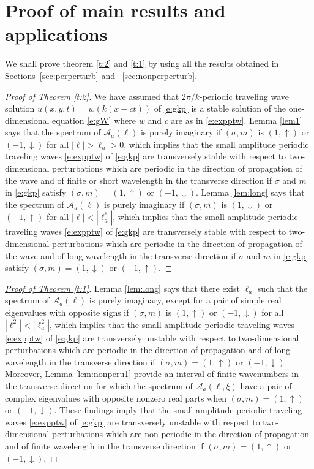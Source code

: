 \documentclass[12pt]{amsart}    %
\newcommand{\oneu}{(1,\uparrow)}
\newcommand{\oned}{(1,\downarrow)}
\newcommand{\minu}{(-1,\uparrow)}
\newcommand{\mind}{(-1,\downarrow)}
\numberwithin{equation}{section}
\begin{document}
\section{Proof of main results and applications}\label{sec:app}
We shall prove theorem \ref{t:2} and \ref{t:1} by using all the results obtained in Sections~\ref{sec:perperturb} and ~\ref{sec:nonperperturb}.
\begin{proof}[\underline{Proof of Theorem \ref{t:2}}]
We have assumed that $2\pi/k$-periodic traveling wave solution $u(x,y,t)=w(k(x-ct))$ of \eqref{e:gkp} is a stable solution of the one-dimensional equation \eqref{e:gW} where $w$ and $c$ are as in \eqref{e:expptw}. Lemma \ref{lem1} says that the spectrum of $\mathcal A_a(\ell)$ is purely imaginary if $(\sigma,m)$ is $\oneu$ or $\mind$ for all $|\ell|>\ell_a>0$, which implies that the small amplitude periodic traveling waves \eqref{e:expptw} of \eqref{e:gkp} are transversely stable with respect to two-dimensional perturbations which are periodic in the direction of propagation of the wave and of finite or short wavelength in the transverse direction if $\sigma$ and $m$ in \eqref{e:gkp} satisfy $(\sigma,m)=\oneu$ or $\mind$. Lemma \ref{lem:long} says that the spectrum of $\mathcal A_a(\ell)$ is purely imaginary if $(\sigma,m)$ is $\oned$ or $\minu$ for all $|\ell|<|\ell^\ast_a|$, which implies that the small amplitude periodic traveling waves \eqref{e:expptw} of \eqref{e:gkp} are transversely stable with respect to two-dimensional perturbations which are periodic in the direction of propagation of the wave and of long wavelength in the transverse direction if $\sigma$ and $m$ in \eqref{e:gkp} satisfy $(\sigma,m)=\oned$ or $\minu$.
\end{proof}

\begin{proof}[\underline{Proof of Theorem \ref{t:1}}]
Lemma \ref{lem:long} says that there exist $\ell_a$ such that the spectrum of $\mathcal A_a(\ell)$ is purely imaginary, except for a pair of simple real eigenvalues with opposite signs if $(\sigma,m)$ is $\oneu$ or $\mind$ for all $|\ell^2|<|\ell_a^2|$, which implies that the small amplitude periodic traveling waves \eqref{e:expptw} of \eqref{e:gkp} are transversely unstable with respect to two-dimensional perturbations which are periodic in the direction of propagation and of long wavelength in the transverse direction if $(\sigma,m)=\oneu$ or $\mind$. Moreover, Lemma \ref{lem:nonperu1} provide an interval of finite wavenumbers in the transverse direction for which the spectrum of $\mathcal A_a(\ell,\xi)$ have a pair of complex eigenvalues with opposite nonzero real parts when $(\sigma,m)=\oneu$ or $\mind$. These findings imply that the small amplitude periodic traveling waves \eqref{e:expptw} of \eqref{e:gkp} are transversely unstable with respect to two-dimensional perturbations which are non-periodic in the direction of propagation and of finite wavelength in the transverse direction if $(\sigma,m)=\oneu$ or $\mind$.
\end{proof}
\end{document}
